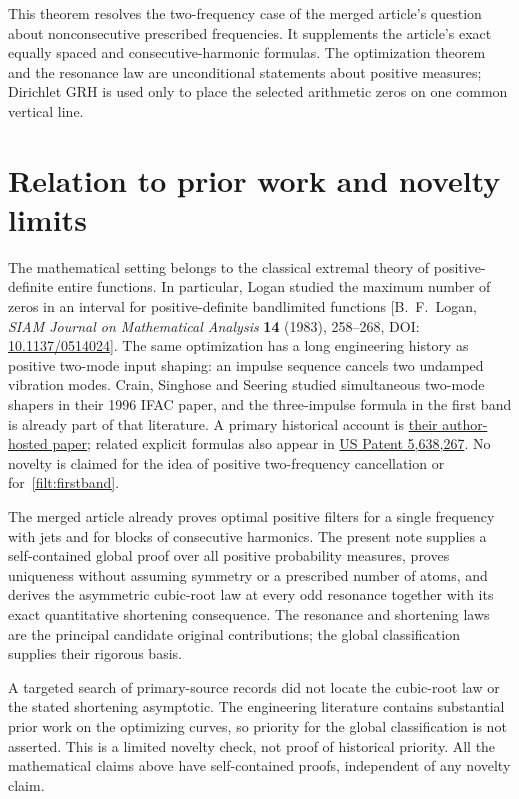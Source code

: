 This theorem resolves the two-frequency case of the merged article's
question about nonconsecutive prescribed frequencies.  It supplements the
article's exact equally spaced and consecutive-harmonic formulas.  The
optimization theorem and the resonance law are unconditional statements
about positive measures; Dirichlet GRH is used only to place the selected
arithmetic zeros on one common vertical line.

\section{Relation to prior work and novelty limits}

The mathematical setting belongs to the classical extremal theory of
positive-definite entire functions.  In particular, Logan studied the
maximum number of zeros in an interval for positive-definite bandlimited
functions [B.~F.~Logan, \emph{SIAM Journal on Mathematical Analysis}
\textbf{14} (1983), 258--268, DOI:
\href{https://doi.org/10.1137/0514024}{10.1137/0514024}].
The same optimization has a long engineering history as positive
two-mode input shaping: an impulse sequence cancels two undamped vibration
modes.  Crain, Singhose and Seering studied simultaneous two-mode shapers
in their 1996 IFAC paper, and the three-impulse formula in the first band
is already part of that literature.  A primary historical account is
\href{https://web.mit.edu/shaping/www/papers/2MIFAC2173.ps}{their author-hosted
paper}; related explicit formulas also appear in
\href{https://patents.google.com/patent/US5638267A/en}{US Patent 5,638,267}.
No novelty is claimed for the idea of positive two-frequency cancellation
or for~\eqref{filt:firstband}.

The merged article already proves optimal positive filters for a single
frequency with jets and for blocks of consecutive harmonics.  The present
note supplies a self-contained global proof over all positive probability
measures, proves uniqueness without assuming symmetry or a prescribed
number of atoms, and derives the asymmetric cubic-root law at every odd
resonance together with its exact quantitative shortening consequence.
The resonance and shortening laws are the principal candidate original
contributions; the global classification supplies their rigorous basis.

A targeted search of primary-source records did not locate the cubic-root
law or the stated shortening asymptotic.  The engineering literature
contains substantial prior work on the optimizing curves, so priority
for the global classification is not asserted.  This is a limited novelty
check, not proof of historical priority.  All the mathematical claims
above have self-contained proofs, independent of any novelty claim.
